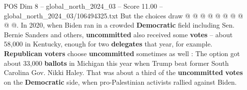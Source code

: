 \begin{textsample}{POS Dim 8 – global\_north\_2024\_03 – Score 11.00 – global\_north\_2024\_03/106494325.txt}
But the choices draw @ @ @ @ @ @ @ @ @ @.
In 2020, when Biden ran in a crowded \textbf{Democratic} field including Sen.
Bernie Sanders and others, \textbf{uncommitted} also received some \textbf{votes} -- about 58,000 in Kentucky, enough for two \textbf{delegates} that year, for example. \textbf{Republican} \textbf{voters} choose \textbf{uncommitted} sometimes as well : The option got about 33,000 \textbf{ballots} in Michigan this year when Trump beat former South Carolina Gov.
Nikki Haley.
That was about a third of the \textbf{uncommitted} \textbf{votes} on the \textbf{Democratic} side, when pro-Palestinian activists rallied against Biden.

\end{textsample}
